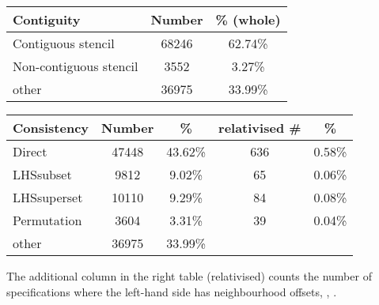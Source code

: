\begin{center}
\begin{minipage}{0.42\linewidth}
\hspace{-1.6em}
\begin{tabular}{l|S[table-format=4]S[table-format=2.2]}
\textbf{Contiguity} & \textbf{Number} & \% {(whole)} \\\hline
Contiguous stencil         & 68246     & 62.74\%  \\\hline
Non-contiguous stencil     & 3552      & 3.27\%  \\\hline
other                      & 36975     & 33.99\% \\\hline
\end{tabular}
\vspace{2.4em}
\end{minipage}
\begin{minipage}{0.5\linewidth}
\begin{tabular}{l|S[table-format=4]S[table-format=2.2]S[table-format=4]S[table-format=2.2]}
\textbf{Consistency} & \textbf{Number} & \% & \textbf{relativised \#} & \% \\\hline
Direct                            & 47448     & 43.62\% & 636       & 0.58\%  \\\hline
LHSsubset                         & 9812      & 9.02\% & 65        & 0.06\%  \\\hline
LHSsuperset                       & 10110     & 9.29\%  & 84        & 0.08\%  \\\hline
Permutation                       & 3604      & 3.31\%  & 39        & 0.04\%  \\\hline
other                             & 36975     & 33.99\% \\\hline
\end{tabular}
\end{minipage}
\end{center}
The additional column in the right table (relativised) counts the
number of specifications where the left-hand side has neighbourhood
offsets, \eg{}, .

